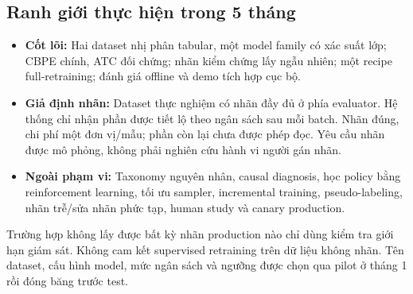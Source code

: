 \subsection{Ranh giới thực hiện trong 5 tháng}
\begin{itemize}
  \item \textbf{Cốt lõi:} Hai dataset nhị phân tabular, một model family có xác suất lớp; CBPE chính, ATC đối chứng; nhãn kiểm chứng lấy ngẫu nhiên; một recipe full-retraining; đánh giá offline và demo tích hợp cục bộ.
  \item \textbf{Giả định nhãn:} Dataset thực nghiệm có nhãn đầy đủ ở phía evaluator. Hệ thống chỉ nhận phần được tiết lộ theo ngân sách sau mỗi batch. Nhãn đúng, chi phí một đơn vị/mẫu; phần còn lại chưa được phép đọc. Yêu cầu nhãn được mô phỏng, không phải nghiên cứu hành vi người gán nhãn.
  \item \textbf{Ngoài phạm vi:} Taxonomy nguyên nhân, causal diagnosis, học policy bằng reinforcement learning, tối ưu sampler, incremental training, pseudo-labeling, nhãn trễ/sửa nhãn phức tạp, human study và canary production.
\end{itemize}
Trường hợp không lấy được bất kỳ nhãn production nào chỉ dùng kiểm tra giới hạn giám sát. Không cam kết supervised retraining trên dữ liệu không nhãn. Tên dataset, cấu hình model, mức ngân sách và ngưỡng được chọn qua pilot ở tháng 1 rồi đóng băng trước test.

